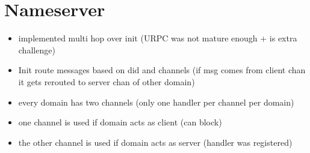 \chapter{Nameserver}

\begin{itemize}
    \item implemented multi hop over init (URPC was not mature enough + is extra challenge)
    \item Init route messages based on did and channels (if msg comes from client chan it gets rerouted to server chan of other domain)
    \item every domain has two channels (only one handler per channel per domain)
    \item one channel is used if domain acts as client (can block)
    \item the other channel is used if domain acts as server (handler was registered)  
\end{itemize}
